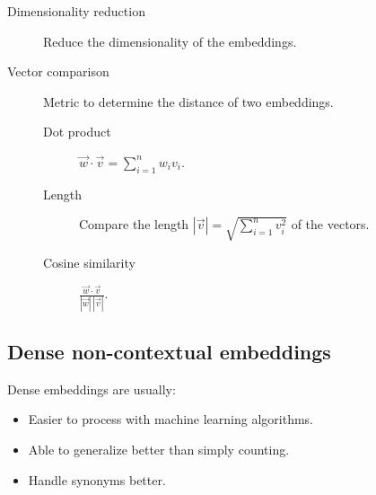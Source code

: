 \begin{description}
    \item[Dimensionality reduction] 
        Reduce the dimensionality of the embeddings.

    \item[Vector comparison] 
        Metric to determine the distance of two embeddings.

        \begin{description}
            \item[Dot product] $\vec{w} \cdot \vec{v} = \sum_{i=1}^{n} w_i v_i$.
            \item[Length] Compare the length $|\vec{v}| = \sqrt{\sum_{i=1}^{n} v_i^2}$ of the vectors.
            \item[Cosine similarity] $\frac{\vec{w} \cdot \vec{v}}{|\vec{w}| \, |\vec{v}|}$.
        \end{description}
\end{description}


\subsection{Dense non-contextual embeddings}

\begin{remark}
    Dense embeddings are usually:
    \begin{itemize}
        \item Easier to process with machine learning algorithms.
        \item Able to generalize better than simply counting.
        \item Handle synonyms better.
    \end{itemize}
\end{remark}

